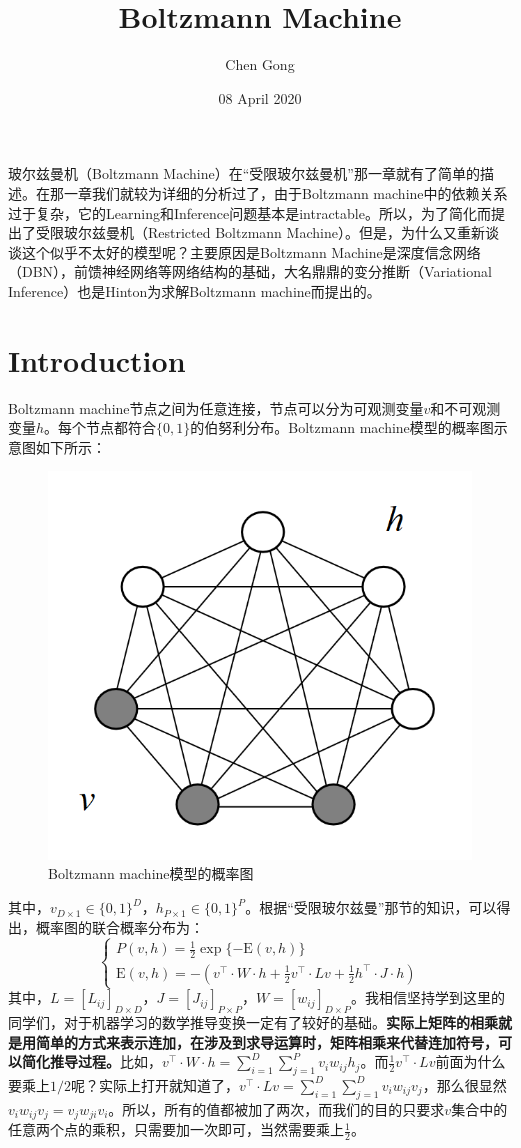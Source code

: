 \documentclass[a4paper]{article}
\title{Boltzmann Machine}
\author{Chen Gong}
\date{08 April 2020}
\begin{document}
\maketitle
\tableofcontents
\newpage
\setcounter{page}{1} %
\clearpage

玻尔兹曼机（Boltzmann Machine）在“受限玻尔兹曼机”那一章就有了简单的描述。在那一章我们就较为详细的分析过了，由于Boltzmann machine中的依赖关系过于复杂，它的Learning和Inference问题基本是intractable。所以，为了简化而提出了受限玻尔兹曼机（Restricted Boltzmann Machine）。但是，为什么又重新谈谈这个似乎不太好的模型呢？主要原因是Boltzmann Machine是深度信念网络（DBN），前馈神经网络等网络结构的基础，大名鼎鼎的变分推断（Variational Inference）也是Hinton为求解Boltzmann machine而提出的。
\section{Introduction}
Boltzmann machine节点之间为任意连接，节点可以分为可观测变量$v$和不可观测变量$h$。每个节点都符合$\{0,1\}$的伯努利分布。Boltzmann machine模型的概率图示意图如下所示：
\begin{figure}[H]
    \centering
    \includegraphics[width=.45\textwidth]{微信图片_20200409150446.png}
    \caption{Boltzmann machine模型的概率图}
    \label{fig:my_label_1}
\end{figure}
其中，$v_{D\times 1} \in \{0,1\}^D$，$h_{P\times 1} \in \{0,1\}^P$。根据“受限玻尔兹曼”那节的知识，可以得出，概率图的联合概率分布为：
\begin{equation}\left\{\begin{array}{l}
P(v, h)=\frac{1}{2} \exp \{-\text{E}(v, h)\} \\
\text{E}(v, h)=-\left(v^{\top} \cdot W \cdot h+\frac{1}{2} v^{\top} \cdot L v+\frac{1}{2} h^{\top} \cdot J \cdot h\right)
\end{array}\right.\end{equation}
其中，$L=[L_{ij}]_{D\times D}$，$J=[J_{ij}]_{P\times P}$，$W= [w_{ij}]_{D\times P}$。我相信坚持学到这里的同学们，对于机器学习的数学推导变换一定有了较好的基础。\textbf{实际上矩阵的相乘就是用简单的方式来表示连加，在涉及到求导运算时，矩阵相乘来代替连加符号，可以简化推导过程。}比如，$v^{\top} \cdot W \cdot h = \sum_{i=1}^D \sum_{j=1}^P v_iw_{ij}h_j$。而$\frac{1}{2} v^{\top} \cdot L v$前面为什么要乘上$1/2$呢？实际上打开就知道了，$v^{\top} \cdot L v = \sum_{i=1}^D \sum_{j=1}^D v_iw_{ij}v_j$，那么很显然$v_iw_{ij}v_j = v_jw_{ji}v_i$。所以，所有的值都被加了两次，而我们的目的只要求$v$集合中的任意两个点的乘积，只需要加一次即可，当然需要乘上$\frac{1}{2}$。
\end{document}
